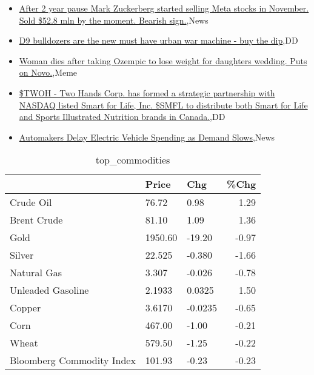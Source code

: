 \documentclass{article}%
\begin{document}
%
\begin{itemize}%
\item%
\href{https://reddit.com/r/wallstreetbets/comments/17s1osi/after\_2\_year\_pause\_mark\_zuckerberg\_started/}{After 2 year pause Mark Zuckerberg started selling Meta stocks in November. Sold \$52.8 mln by the moment. Bearish sign.},News%
\item%
\href{https://reddit.com/r/wallstreetbets/comments/17s16k8/d9\_bulldozers\_are\_the\_new\_must\_have\_urban\_war/}{D9 bulldozers are the new must have urban war machine - buy the dip},DD%
\item%
\href{https://reddit.com/r/wallstreetbets/comments/17rzu2t/woman\_dies\_after\_taking\_ozempic\_to\_lose\_weight/}{Woman dies after taking Ozempic to lose weight for daughters wedding. Puts on Novo.},Meme%
\item%
\href{https://reddit.com/r/Baystreetbets/comments/17rhg2u/twoh\_two\_hands\_corp\_has\_formed\_a\_strategic/}{\$TWOH - Two Hands Corp. has formed a strategic partnership with NASDAQ listed Smart for Life, Inc. \$SMFL to distribute both Smart for Life and Sports Illustrated Nutrition brands in Canada.},DD%
\item%
\href{https://reddit.com/r/Economics/comments/17rrbwx/automakers\_delay\_electric\_vehicle\_spending\_as/}{Automakers Delay Electric Vehicle Spending as Demand Slows},News%
\end{itemize}%


\begin{table}[htbp]%
\caption{top\_commodities}%
\centering%
\begin{adjustbox}{width=1\textwidth}%
\begin{tabular}{lllr}
\toprule
                          &   Price &     Chg &  \%Chg \\
\midrule
               Crude Oil  &   76.72 &    0.98 &  1.29 \\
             Brent Crude  &   81.10 &    1.09 &  1.36 \\
                    Gold  & 1950.60 &  -19.20 & -0.97 \\
                  Silver  &  22.525 &  -0.380 & -1.66 \\
             Natural Gas  &   3.307 &  -0.026 & -0.78 \\
       Unleaded Gasoline  &  2.1933 &  0.0325 &  1.50 \\
                  Copper  &  3.6170 & -0.0235 & -0.65 \\
                    Corn  &  467.00 &   -1.00 & -0.21 \\
                   Wheat  &  579.50 &   -1.25 & -0.22 \\
Bloomberg Commodity Index &  101.93 &   -0.23 & -0.23 \\
\bottomrule
\end{tabular}
%
\end{adjustbox}%
\end{table}
\end{document}
